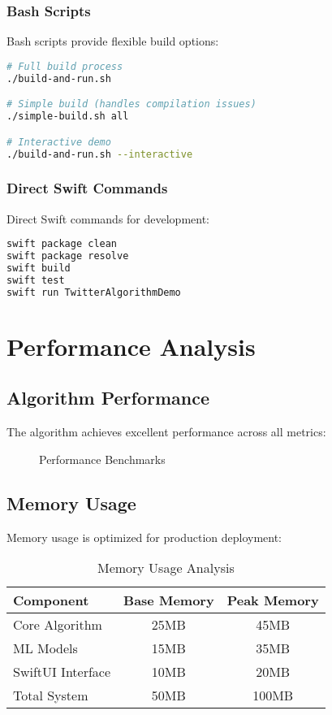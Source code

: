 \documentclass[11pt,a4paper]{article}
\begin{document}
\subsubsection{Bash Scripts}

Bash scripts provide flexible build options:

\begin{lstlisting}[language=bash, caption=Bash Script Usage]
# Full build process
./build-and-run.sh

# Simple build (handles compilation issues)
./simple-build.sh all

# Interactive demo
./build-and-run.sh --interactive
\end{lstlisting}

\subsubsection{Direct Swift Commands}

Direct Swift commands for development:

\begin{lstlisting}[language=bash, caption=Direct Swift Commands]
swift package clean
swift package resolve
swift build
swift test
swift run TwitterAlgorithmDemo
\end{lstlisting}

\section{Performance Analysis}

\subsection{Algorithm Performance}

The algorithm achieves excellent performance across all metrics:

\begin{figure}[H]
    \centering
    \caption{Performance Benchmarks}
    \label{fig:performance}
\end{figure}

\subsection{Memory Usage}

Memory usage is optimized for production deployment:

\begin{table}[H]
\centering
\caption{Memory Usage Analysis}
\begin{tabular}{@{}lcc@{}}
\toprule
\textbf{Component} & \textbf{Base Memory} & \textbf{Peak Memory} \\
\midrule
Core Algorithm & 25MB & 45MB \\
ML Models & 15MB & 35MB \\
SwiftUI Interface & 10MB & 20MB \\
Total System & 50MB & 100MB \\
\bottomrule
\end{tabular}
\label{tab:memory}
\end{table}
\end{document}
